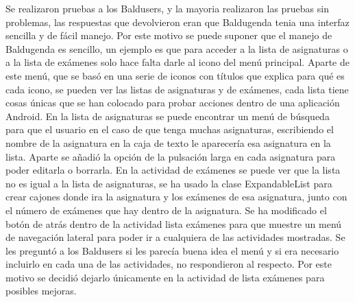 Se realizaron pruebas a los Baldusers, y la mayoria realizaron las pruebas sin problemas, las respuestas que devolvieron eran que Baldugenda tenia una interfaz sencilla y de fácil manejo. Por este motivo se puede suponer que el manejo de Baldugenda es sencillo, un ejemplo es que para acceder a la lista de asignaturas o a la lista de exámenes solo hace falta darle al icono del menú principal.
Aparte de este menú, que se basó en una serie de iconos con títulos que explica para qué es cada icono, se pueden ver las listas de asignaturas y de exámenes, cada lista tiene cosas únicas que se han colocado para probar acciones dentro de una aplicación Android.
En la lista de asignaturas se puede encontrar un menú de búsqueda para que el usuario en el caso de que tenga muchas asignaturas, escribiendo el nombre de la asignatura en la caja de texto le aparecería esa asignatura en la lista.
Aparte se añadió la opción de la pulsación larga en cada asignatura para poder editarla o borrarla.
En la actividad de exámenes se puede ver que la lista no es igual a la lista de asignaturas, se ha usado la clase ExpandableList para crear cajones donde ira la asignatura y los exámenes de esa asignatura, junto con el número de exámenes que hay dentro de la asignatura.
Se ha modificado el botón de atrás dentro de la actividad lista exámenes para que muestre un menú de navegación lateral para poder ir a cualquiera de las actividades mostradas. Se les preguntó a los Baldusers si les parecía buena idea el menú y si era necesario incluirlo en cada una de las actividades, no respondieron al respecto. Por este motivo se decidió dejarlo únicamente en la actividad de lista exámenes para posibles mejoras.
